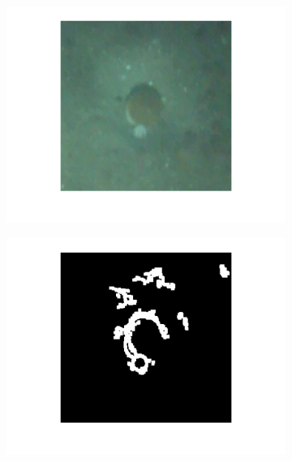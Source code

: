 \documentclass {udthesis}
\begin{document}
\begin{figure}
  \centering
  \begin{subfigure}[]{0.17\textwidth}
      \includegraphics[width=\textwidth,natwidth=842,natheight=844]{fixationwindow.pdf}
      \caption{}
      \label{subfig:fixationwindow}
  \end{subfigure}
  \begin{subfigure}[]{0.17\textwidth}
      \includegraphics[width=\textwidth,natwidth=837,natheight=839]{edgeimg.pdf}
      \caption{}
      \label{subfig:edgeimg}
  \end{subfigure}
  \begin{subfigure}[]{0.17\textwidth}

\end{subfigure}
\end{figure}
\end{document}
